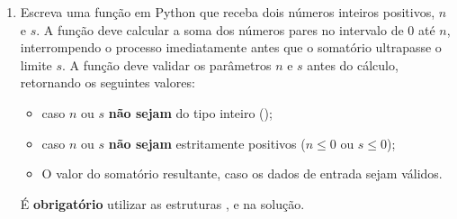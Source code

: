\begin{enumerate}[label=\textbf{Q\arabic*.}]
    \noindent  Utilize a estrutura de repetição  para fazer a questão.

    

    \vspace{0.5cm}
    \item Escreva uma função em Python que receba dois números inteiros positivos, $n$ e $s$. A função deve calcular a soma dos números pares no intervalo de $0$ até $n$, interrompendo o processo imediatamente antes que o somatório ultrapasse o limite $s$.
    A função deve validar os parâmetros $n$ e $s$ antes do cálculo, retornando os seguintes valores:
    \begin{itemize}
        \item {} caso $n$ ou $s$ \textbf{não sejam} do tipo inteiro ();
        \item {} caso $n$ ou $s$ \textbf{não sejam} estritamente positivos ($n \le 0$ ou $s \le 0$);
        \item O valor do somatório resultante, caso os dados de entrada sejam válidos.
    \end{itemize}

    \noindent É \textbf{obrigatório} utilizar as estruturas ,  e  na solução.

    
\end{enumerate}